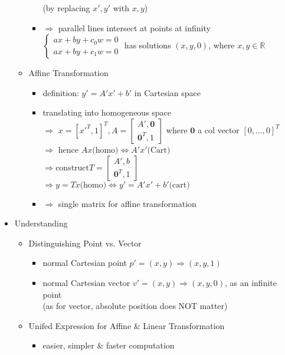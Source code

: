 \begin{itemize}
\begin{itemize}
\begin{itemize}
		(by replacing $x',y'$ with $x, y$)
		\item $\Rightarrow$ parallel lines intersect at points at infinity \\
		$\begin{cases} ax + by + c_0 w = 0 \\ ax + by + c_1 w = 0 \end{cases}$ has solutions $(x,y,0)$, where $x,y\in \mathbb R$ 
		\end{itemize}
	\item Affine Transformation
		\begin{itemize}
	    \item definition: $y'=A'x'+b'$ in Cartesian space
	    \item translating into homogeneous space \\
	    $\Rightarrow$ $x = [x'^T,1]^T, A=\begin{bmatrix} A', \mathbf 0 \\ \mathbf 0^T, 1 \end{bmatrix}$ where $\mathbf 0$ a col vector $[0,...,0]^T$ \\ 
	    $\Rightarrow$ hence $Ax \text{(homo)} \Leftrightarrow A'x' \text{(Cart)}$ \\
	    $\Rightarrow \text{construct} T = \begin{bmatrix} A', b \\ \mathbf 0^T, 1 \end{bmatrix}$\\
	    $\Rightarrow y=Tx \text{(homo)}  \Leftrightarrow  y'=A'x'+b' \text{(cart)}$
	    \item $\Rightarrow$ single matrix for affine transformation 
		\end{itemize}
	\end{itemize}
\item Understanding
	\begin{itemize}
	\item Distinguishing Point vs. Vector
		\begin{itemize}
		\item normal Cartesian point $p' = (x,y) \Rightarrow (x,y,1)$
		\item normal Cartesian vector $v' = (x,y) \Rightarrow (x,y, 0)$, as an infinite point \\
		(as for vector, absolute position does NOT matter)
		\end{itemize}
  	\item Unifed Expression for Affine \& Linear Transformation
  		\begin{itemize}
  		\item easier, simpler \& faster computation
  		\end{itemize}
	\end{itemize}
\end{itemize}
 
